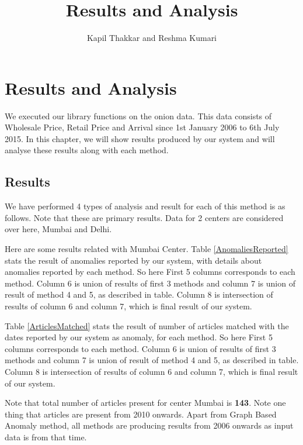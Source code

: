 \documentclass[a4paper,10pt]{report}
\title{Results and Analysis}
\author{Kapil Thakkar and Reshma Kumari}
\begin{document}
\maketitle

\chapter{Results and Analysis}

We executed our library functions on the onion data. This data consists of 
Wholesale Price, Retail Price and Arrival since 1st January 2006 to 6th July 
2015. In this chapter, we will show results produced by our system and will 
analyse these results along with each method.

\section{Results}

We have performed 4 types of analysis and result for each of this method is as 
follows. Note that these are primary results. Data for 2 centers are considered 
over here, Mumbai and Delhi.

Here are some results related with Mumbai Center. Table \ref{AnomaliesReported} stats the result of anomalies reported by our system, with details about anomalies reported by each method. So here First 5 columns corresponds to each method. Column 6 is union of results of first 3 methods and column 7 is union of result of method 4 and 5, as described in table. Column 8 is intersection of results of column 6 and column 7, which is final result of our system.


Table \ref{ArticlesMatched} stats the result of number of articles matched with the dates reported by our system as anomaly, for each method. So here First 5 columns corresponds to each method. Column 6 is union of results of first 3 methods and column 7 is union of result of method 4 and 5, as described in table. Column 8 is intersection of results of column 6 and column 7, which is final result of our system.


Note that total number of articles present for center Mumbai is \textbf{143}. Note one thing that articles are present from 2010 onwards. Apart from Graph Based Anomaly method, all methods are producing results from 2006 onwards as input data is from that time.
 
\end{document}
